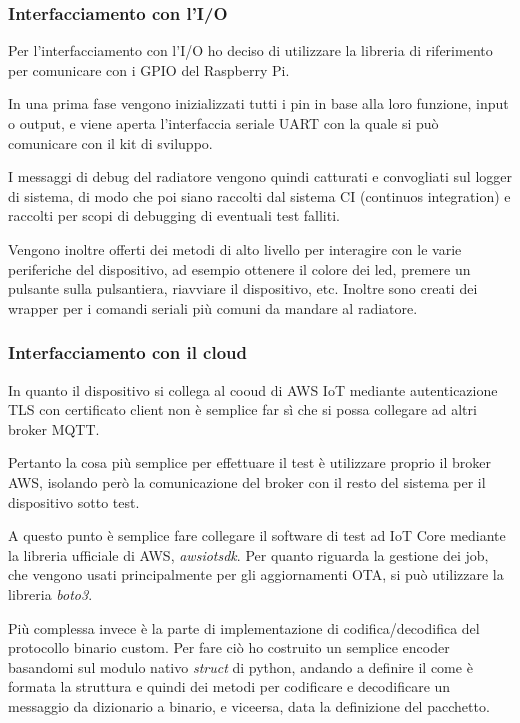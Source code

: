 \documentclass[a4paper,titlepage]{article}
\begin{document}
\subsubsection{Interfacciamento con l'I/O}

Per l'interfacciamento con l'I/O ho deciso di utilizzare la libreria di riferimento
per comunicare con i GPIO del Raspberry Pi.

In una prima fase vengono inizializzati tutti i pin in base alla loro funzione, input
o output, e viene aperta l'interfaccia seriale UART con la quale si può comunicare con
il kit di sviluppo.

I messaggi di debug del radiatore vengono quindi catturati e convogliati sul logger
di sistema, di modo che poi siano raccolti dal sistema CI (continuos integration)
e raccolti per scopi di debugging di eventuali test falliti.

Vengono inoltre offerti dei metodi di alto livello per interagire con le varie
periferiche del dispositivo, ad esempio ottenere il colore dei led, premere un
pulsante sulla pulsantiera, riavviare il dispositivo, etc.
Inoltre sono creati dei wrapper per i comandi seriali più comuni da mandare al
radiatore.

\subsubsection{Interfacciamento con il cloud}

In quanto il dispositivo si collega al cooud di AWS IoT mediante autenticazione
TLS con certificato client non è semplice far sì che si possa collegare ad altri
broker MQTT.

Pertanto la cosa più semplice per effettuare il test è utilizzare proprio il broker
AWS, isolando però la comunicazione del broker con il resto del sistema per il dispositivo
sotto test.

A questo punto è semplice fare collegare il software di test ad IoT Core mediante
la libreria ufficiale di AWS, \textit{awsiotsdk}. Per quanto riguarda la gestione
dei job, che vengono usati principalmente per gli aggiornamenti OTA, si può utilizzare
la libreria \textit{boto3}.

Più complessa invece è la parte di implementazione di codifica/decodifica del protocollo
binario custom. Per fare ciò ho costruito un semplice encoder basandomi sul modulo
nativo \textit{struct} di python, andando a definire il come è formata la struttura
e quindi dei metodi per codificare e decodificare un messaggio da dizionario a binario,
e viceersa, data la definizione del pacchetto.
\end{document}
